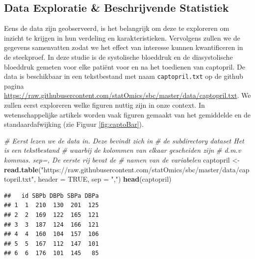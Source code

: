 \documentclass[
  12pt,dutch]{book}
\newenvironment{Shaded}{\begin{snugshade}}{\end{snugshade}}
\newcommand{\AttributeTok}[1]{\textcolor[rgb]{0.13,0.29,0.53}{#1}}
\newcommand{\CommentTok}[1]{\textcolor[rgb]{0.56,0.35,0.01}{\textit{#1}}}
\newcommand{\ConstantTok}[1]{\textcolor[rgb]{0.56,0.35,0.01}{#1}}
\newcommand{\FunctionTok}[1]{\textcolor[rgb]{0.13,0.29,0.53}{\textbf{#1}}}
\newcommand{\NormalTok}[1]{#1}
\newcommand{\OtherTok}[1]{\textcolor[rgb]{0.56,0.35,0.01}{#1}}
\newcommand{\StringTok}[1]{\textcolor[rgb]{0.31,0.60,0.02}{#1}}
\theoremstyle{definition}
\theoremstyle{definition}
\theoremstyle{definition}
\theoremstyle{definition}
\theoremstyle{remark}
\begin{document}
\subsection{Data Exploratie \& Beschrijvende Statistiek}\label{data-exploratie-beschrijvende-statistiek}

Eens de data zijn geobserveerd, is het belangrijk om deze te exploreren om inzicht te krijgen in hun verdeling en karakteristieken.
Vervolgens zullen we de gegevens samenvatten zodat we het effect van interesse kunnen kwantificeren in de steekproef.
In deze studie is de systolische bloeddruk en de diasystolische bloeddruk gemeten voor elke patiënt voor en na het toedienen van captopril.
De data is beschikbaar in een tekstbestand met naam \texttt{captopril.txt} op de github pagina \url{https://raw.githubusercontent.com/statOmics/sbc/master/data/captopril.txt}.
We zullen eerst exploreren welke figuren nuttig zijn in onze context.
In wetenschappelijke artikels worden vaak figuren gemaakt van het gemiddelde en de standaardafwijking (zie Figuur \ref{fig:captoBar}).

\begin{Shaded}
\begin{Highlighting}[]
\CommentTok{\# Eerst lezen we de data in. Deze bevindt zich in}
\CommentTok{\# de subdirectory dataset Het is een tekstbestand}
\CommentTok{\# waarbij de kolommen van elkaar gescheiden zijn}
\CommentTok{\# d.m.v kommas. sep=\textquotesingle{},\textquotesingle{} De eerste rij bevat de}
\CommentTok{\# namen van de variabelen}
\NormalTok{captopril }\OtherTok{\textless{}{-}} \FunctionTok{read.table}\NormalTok{(}\StringTok{"https://raw.githubusercontent.com/statOmics/sbc/master/data/captopril.txt"}\NormalTok{,}
    \AttributeTok{header =} \ConstantTok{TRUE}\NormalTok{, }\AttributeTok{sep =} \StringTok{","}\NormalTok{)}
\FunctionTok{head}\NormalTok{(captopril)}
\end{Highlighting}
\end{Shaded}

\begin{verbatim}
##   id SBPb DBPb SBPa DBPa
## 1  1  210  130  201  125
## 2  2  169  122  165  121
## 3  3  187  124  166  121
## 4  4  160  104  157  106
## 5  5  167  112  147  101
## 6  6  176  101  145   85
\end{verbatim}
\end{document}
